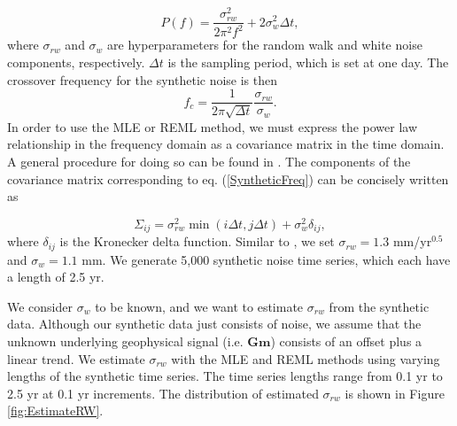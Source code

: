 \documentclass[10pt,a4paper]{article}
\begin{document}
\begin{equation}\label{SyntheticFreq}
P(f) = \frac{\sigma_{rw}^2}{2\pi^2 f^2} + 2\sigma_w^2\Delta t,
\end{equation}  
where $\sigma_{rw}$ and $\sigma_w$ are hyperparameters for the random walk and white noise components, respectively. $\Delta t$ is the sampling period, which is set at one day. The crossover frequency for the synthetic noise is then
\begin{equation}\label{Crossover}
f_c = \frac{1}{2\pi\sqrt{\Delta t}}\frac{\sigma_{rw}}{\sigma_w}.  
\end{equation}
In order to use the MLE or REML method, we must express the power law relationship in the frequency domain as a covariance matrix in the time domain. A general procedure for doing  so can be found in \citet{Langbein2004}. The components of the covariance matrix corresponding to eq. (\ref{SyntheticFreq}) can be concisely written as

\begin{equation}\label{Covariance}
\Sigma_{ij} = \sigma_{rw}^2 \min(i\Delta t,j\Delta t) + \sigma_w^2 \delta_{ij},
\end{equation} 
where $\delta_{ij}$ is the Kronecker delta function. Similar to \citet{Langbein2012}, we set $\sigma_{rw} = 1.3$ mm/yr$^{0.5}$ and $\sigma_w = 1.1$ mm. We generate 5,000 synthetic noise time series, which each have a length of 2.5 yr. 

We consider $\sigma_w$ to be known, and we want to estimate $\sigma_{rw}$ from the synthetic data. Although our synthetic data just consists of noise, we assume that the unknown underlying geophysical signal (i.e. $\mathbf{G}\mathbf{m}$) consists of an offset plus a linear trend. We estimate $\sigma_{rw}$ with the MLE and REML methods using varying lengths of the synthetic time series. The time series lengths range from 0.1 yr to 2.5 yr at 0.1 yr increments. The distribution of estimated $\sigma_{rw}$ is shown in Figure \ref{fig:EstimateRW}. 
\end{document}
